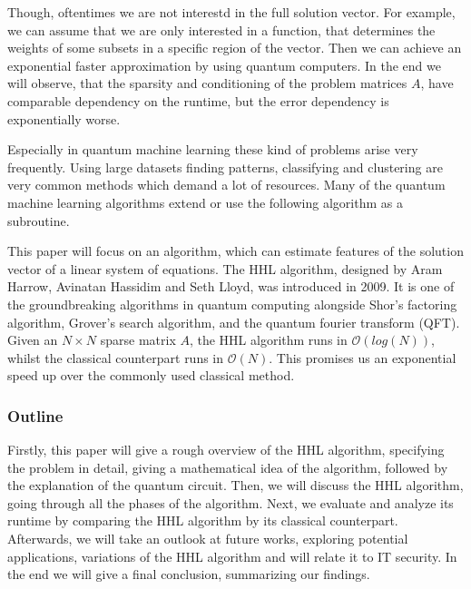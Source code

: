 Though, oftentimes we are not interestd in the full solution vector. 
For example, we can assume that we are only interested in a function, that determines the weights of some subsets in a specific region of the vector.
Then we can achieve an exponential faster approximation by using quantum computers. 
In the end we will observe, that the sparsity and conditioning of the problem matrices $A$, have comparable dependency on the runtime, but the error dependency is exponentially worse. 

Especially in quantum machine learning these kind of problems arise very frequently. 
Using large datasets finding patterns, classifying and clustering are very common methods which demand a lot of resources. 
Many of the quantum machine learning algorithms extend or use the following algorithm as a subroutine. 

This paper will focus on an algorithm, which can estimate features of the solution vector of a linear system of equations.
The HHL algorithm, designed by Aram Harrow, Avinatan Hassidim and Seth Lloyd, was introduced in 2009. 
It is one of the groundbreaking algorithms in quantum computing alongside Shor's factoring algorithm, Grover's search algorithm, and the quantum fourier transform (QFT).
Given an $N \times N$ sparse matrix $A$, the HHL algorithm runs in $\mathcal{O} (log (N))$, whilst the classical counterpart runs in $\mathcal{O} (N)$.
This promises us an exponential speed up over the commonly used classical method.

\subsubsection{Outline}
Firstly, this paper will give a rough overview of the HHL algorithm, specifying the problem in detail, giving a mathematical idea of the algorithm, followed by the explanation of the quantum circuit.
Then, we will discuss the HHL algorithm, going through all the phases of the algorithm.
Next, we evaluate and analyze its runtime by comparing the HHL algorithm by its classical counterpart. 
Afterwards, we will take an outlook at future works, exploring potential applications, variations of the HHL algorithm and will relate it to IT security. 
In the end we will give a final conclusion, summarizing our findings. 




